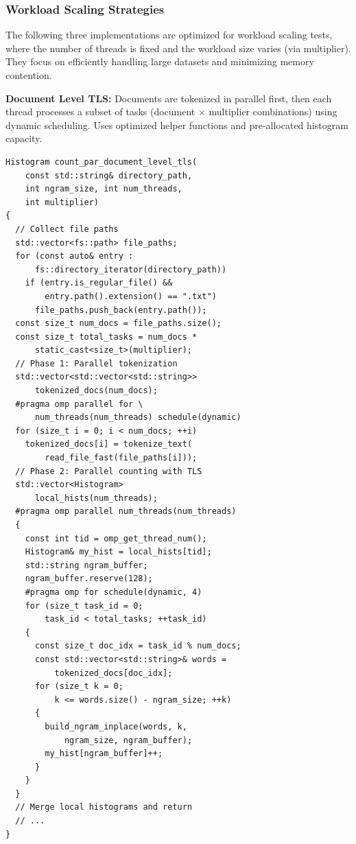 \documentclass[10pt,twocolumn,letterpaper]{article}
\begin{document}
\subsubsection{Workload Scaling Strategies}

The following three implementations are optimized for workload scaling tests, where the number of threads is fixed and the workload size varies (via multiplier). They focus on efficiently handling large datasets and minimizing memory contention.

\textbf{Document Level TLS:} Documents are tokenized in parallel first, then each thread processes a subset of tasks (document $\times$ multiplier combinations) using dynamic scheduling. Uses optimized helper functions and pre-allocated histogram capacity.

\begin{lstlisting}
Histogram count_par_document_level_tls(
    const std::string& directory_path,
    int ngram_size, int num_threads, 
    int multiplier)
{
  // Collect file paths
  std::vector<fs::path> file_paths;
  for (const auto& entry : 
      fs::directory_iterator(directory_path))
    if (entry.is_regular_file() && 
        entry.path().extension() == ".txt")
      file_paths.push_back(entry.path());
  const size_t num_docs = file_paths.size();
  const size_t total_tasks = num_docs * 
      static_cast<size_t>(multiplier);
  // Phase 1: Parallel tokenization
  std::vector<std::vector<std::string>> 
      tokenized_docs(num_docs);
  #pragma omp parallel for \
      num_threads(num_threads) schedule(dynamic)
  for (size_t i = 0; i < num_docs; ++i)
    tokenized_docs[i] = tokenize_text(
        read_file_fast(file_paths[i]));
  // Phase 2: Parallel counting with TLS
  std::vector<Histogram> 
      local_hists(num_threads);
  #pragma omp parallel num_threads(num_threads)
  {
    const int tid = omp_get_thread_num();
    Histogram& my_hist = local_hists[tid];
    std::string ngram_buffer;
    ngram_buffer.reserve(128);
    #pragma omp for schedule(dynamic, 4)
    for (size_t task_id = 0; 
        task_id < total_tasks; ++task_id)
    {
      const size_t doc_idx = task_id % num_docs;
      const std::vector<std::string>& words = 
          tokenized_docs[doc_idx];
      for (size_t k = 0; 
          k <= words.size() - ngram_size; ++k)
      {
        build_ngram_inplace(words, k, 
            ngram_size, ngram_buffer);
        my_hist[ngram_buffer]++;
      }
    }
  }
  // Merge local histograms and return
  // ...
}
\end{lstlisting}
\end{document}
